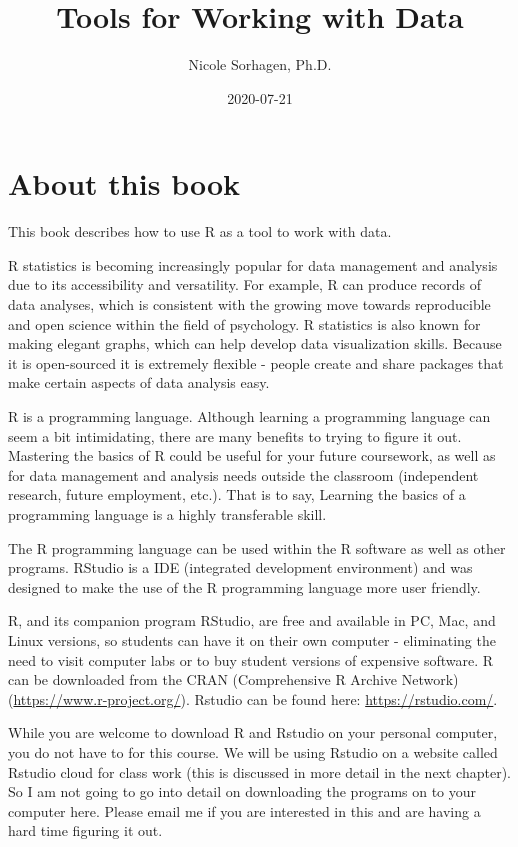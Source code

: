 \documentclass[
]{book}
\title{Tools for Working with Data}
\author{Nicole Sorhagen, Ph.D.}
\date{2020-07-21}
\begin{document}
\maketitle

{
\setcounter{tocdepth}{1}
\tableofcontents
}
\hypertarget{about-this-book}{%
\chapter{About this book}\label{about-this-book}}

This book describes how to use R as a tool to work with data.

R statistics is becoming increasingly popular for data management and analysis due to its accessibility and versatility. For example, R can produce records of data analyses, which is consistent with the growing move towards reproducible and open science within the field of psychology. R statistics is also known for making elegant graphs, which can help develop data visualization skills. Because it is open-sourced it is extremely flexible - people create and share packages that make certain aspects of data analysis easy.

R is a programming language. Although learning a programming language can seem a bit intimidating, there are many benefits to trying to figure it out. Mastering the basics of R could be useful for your future coursework, as well as for data management and analysis needs outside the classroom (independent research, future employment, etc.). That is to say, Learning the basics of a programming language is a highly transferable skill.

The R programming language can be used within the R software as well as other programs. RStudio is a IDE (integrated development environment) and was designed to make the use of the R programming language more user friendly.

R, and its companion program RStudio, are free and available in PC, Mac, and Linux versions, so students can have it on their own computer - eliminating the need to visit computer labs or to buy student versions of expensive software. R can be downloaded from the CRAN (Comprehensive R Archive Network) (\url{https://www.r-project.org/}). Rstudio can be found here: \url{https://rstudio.com/}.

While you are welcome to download R and Rstudio on your personal computer, you do not have to for this course. We will be using Rstudio on a website called Rstudio cloud for class work (this is discussed in more detail in the next chapter). So I am not going to go into detail on downloading the programs on to your computer here. Please email me if you are interested in this and are having a hard time figuring it out.
\end{document}
